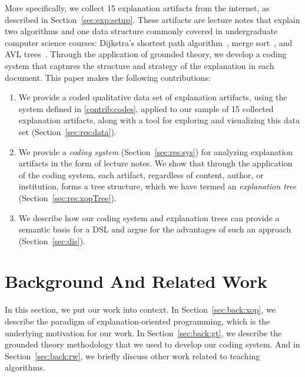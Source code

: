 \documentclass[sigconf]{acmart}
\begin{document}
More specifically, we collect 15 explanation artifacts from the internet, as
described in Section~\ref{sec:exp:setup}. These artifacts are lecture notes
that explain two algorithms and one data structure commonly covered in
undergraduate computer science courses: Dijkstra's shortest path
algorithm~\cite[pp.~137--142]{KT06}, merge sort~\cite[210--214]{KT06}, and AVL
trees~\cite[pp.~458--475]{KnuthArt3}.
%
Through the application of grounded theory, we develop a coding system that
captures the structure and strategy of the explanation in each document.
This paper makes the following contributions:
%
\begin{enumerate}[label=C\arabic*.,ref=C\arabic*,leftmargin=*]


\item \label{contrib:data}
%
We provide a coded qualitative data set of explanation artifacts, using the
system defined in \ref{contrib:codes}, applied to our sample of 15 collected
explanation artifacts, along with a tool for exploring and visualizing this
data set (Section~\ref{sec:res:data}).

\item \label{contrib:codes}
%
We provide a \emph{coding system} (Section~\ref{sec:res:sys}) for analyzing
explanation artifacts in the form of lecture notes. We show that through the
application of the coding system, each artifact, regardless of content, author,
or institution, forms a tree structure, which we have termed an
\emph{explanation tree} (Section~\ref{sec:res:xopTree}).


\item \label{contrib:DSL}
%
We describe how our coding system and explanation trees can provide a semantic
basis for a DSL and argue for the advantages of such an approach
(Section~\ref{sec:dis}).
%
\end{enumerate}

\noindent

\section{Background And Related Work}
\label{sec:back}

In this section, we put our work into context.
%
In Section~\ref{sec:back:xop}, we describe the paradigm of explanation-oriented
programming, which is the underlying motivation for our work.
%
In Section~\ref{sec:back:gt}, we describe the grounded theory methodology that
we used to develop our coding system.
%
And in Section~\ref{sec:back:rw}, we briefly discuss other work related to
teaching algorithms.
\end{document}
